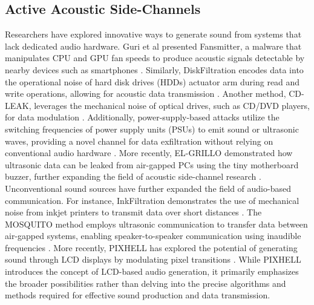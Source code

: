 \subsection{Active Acoustic Side-Channels}
Researchers have explored innovative ways to generate sound from systems that lack dedicated audio hardware. Guri et al presented Fansmitter, a malware that manipulates CPU and GPU fan speeds to produce acoustic signals detectable by nearby devices such as smartphones \cite{guri2020fansmitter}\cite{guri2022gpu}. Similarly, DiskFiltration encodes data into the operational noise of hard disk drives (HDDs) actuator arm during read and write operations, allowing for acoustic data transmission \cite{guri2016diskfiltration}. Another method, CD-LEAK, leverages the mechanical noise of optical drives, such as CD/DVD players, for data modulation \cite{guri2020cd}. Additionally, power-supply-based attacks utilize the switching frequencies of power supply units (PSUs) to emit sound or ultrasonic waves, providing a novel channel for data exfiltration without relying on conventional audio hardware \cite{guri2021power}. More recently, EL-GRILLO demonstrated how ultrasonic data can be leaked from air-gapped PCs using the tiny motherboard buzzer, further expanding the field of acoustic side-channel research \cite{guri2023grillo}. 
Unconventional sound sources have further expanded the field of audio-based communication. For instance, InkFiltration demonstrates the use of mechanical noise from inkjet printers to transmit data over short distances \cite{de2022inkfiltration}. The MOSQUITO method employs ultrasonic communication to transfer data between air-gapped systems, enabling speaker-to-speaker communication using inaudible frequencies \cite{guri2018mosquito}. More recently, PIXHELL has explored the potential of generating sound through LCD displays by modulating pixel transitions \cite{guri2024pixhell}. While PIXHELL introduces the concept of LCD-based audio generation, it primarily emphasizes the broader possibilities rather than delving into the precise algorithms and methods required for effective sound production and data transmission.

